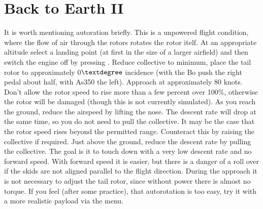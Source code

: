 
\section{Back to Earth II}

It is worth mentioning autoration briefly. This is a unpowered flight condition, 
where the flow of air through the rotors rotates the rotor itelf. At an 
appropriate altitude select a landing point (at first in the size of a larger 
airfield) and then switch the engine off by pressing \key{\{}. Reduce 
collective to minimum, place the tail rotor to approximately 0$\textdegree$ 
incidence (with the Bo push the right pedal about half, with As350 the left). 
Approach at approximately 80 knots. Don't allow the rotor speed to rise more 
than a few percent over 100\%, otherwise the rotor will be damaged (though 
this is not currently simulated). As you reach the ground, reduce the airspeed 
by lifting the nose. The descent rate will drop at the same time, so you do 
not need to pull the collective. It may be the case that the rotor speed 
rises beyond the permitted range. Counteract this by raising the collective 
if required. Just above the ground, reduce the descent rate by pulling the 
collective. The goal is it to touch down with a very low descent rate and no 
forward speed. With forward speed it is easier, but there is a danger of a 
roll over if the skids are not aligned parallel to the flight direction. 
During the approach it is not necessary to adjust the tail rotor, since 
without power there is almost no torque. If you feel (after some practice), 
that autorotation is too easy, try it with a more realistic payload via 
the  menu. 














